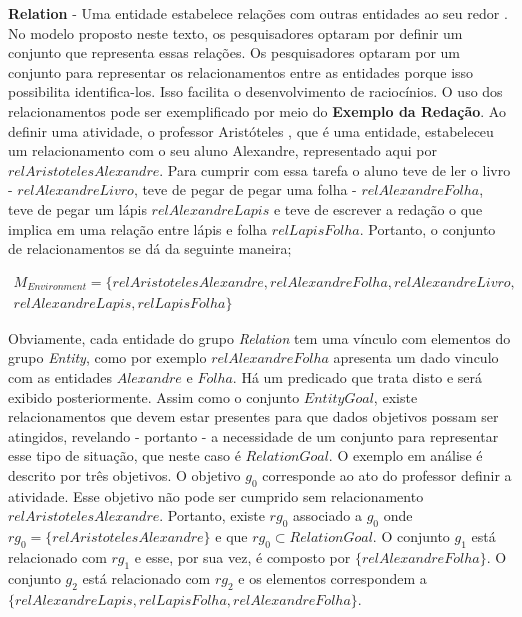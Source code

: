 \textbf{Relation} - Uma entidade estabelece relações com outras entidades ao seu redor \cite{entity}. No modelo proposto neste texto, 
os pesquisadores optaram por definir um conjunto que representa essas relações. Os pesquisadores optaram por um conjunto para representar
os relacionamentos entre as entidades porque isso possibilita identifica-los. Isso facilita o desenvolvimento de raciocínios. O uso 
dos relacionamentos pode ser exemplificado por meio do \textbf{Exemplo da Redação}. Ao definir uma atividade, o professor Aristóteles
, que é uma entidade, estabeleceu um relacionamento com o seu aluno Alexandre, representado aqui por $relAristotelesAlexandre$. 
Para cumprir com essa tarefa o aluno teve de ler o livro - $relAlexandreLivro$, teve de pegar de pegar uma folha - $relAlexandreFolha$,
teve de pegar um lápis $relAlexandreLapis$ e teve de escrever a redação o que implica em uma relação entre lápis e folha $relLapisFolha$. 
Portanto, o conjunto de relacionamentos se dá da seguinte maneira;

\begin{eqnarray}\label{Environment}\nonumber
    M_{Environment} = \{ relAristotelesAlexandre, relAlexandreFolha, relAlexandreLivro, \\ \nonumber
     relAlexandreLapis, relLapisFolha \}
\end{eqnarray}

Obviamente, cada entidade do grupo \textit{Relation} tem uma vínculo com elementos do grupo \textit{Entity}, como por exemplo 
$relAlexandreFolha$ apresenta um dado vinculo com as entidades $Alexandre$ e $Folha$. Há um predicado que trata disto e será
exibido posteriormente. Assim como o conjunto $EntityGoal$, existe relacionamentos que devem estar presentes para que dados 
objetivos possam ser atingidos, revelando - portanto - a necessidade de um conjunto para representar esse tipo de situação, 
que neste caso é $RelationGoal$. O exemplo em análise é descrito por três objetivos. O objetivo $g_0$ corresponde ao ato 
do professor definir a atividade. Esse objetivo não pode ser cumprido sem relacionamento $relAristotelesAlexandre$. 
Portanto, existe $rg_0$ associado a $g_0$ onde $rg_0 = \{ relAristotelesAlexandre \}$ e que $rg_0 \subset RelationGoal$. 
O conjunto $g_1$ está relacionado com $rg_1$ e esse, por sua vez, é composto por $\{ relAlexandreFolha\}$. O conjunto $g_2$ 
está relacionado com $rg_2$ e os elementos correspondem a $\{ relAlexandreLapis, relLapisFolha, relAlexandreFolha\}$.

